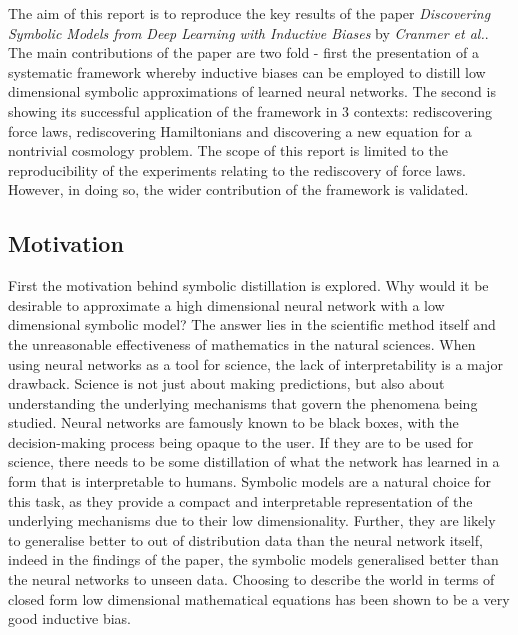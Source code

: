 \documentclass[11pt]{article}
\begin{document}





The aim of this report is to reproduce the key results of the paper \textit{Discovering Symbolic Models from Deep Learning with Inductive Biases} by \textit{Cranmer et al.}. The main contributions of the paper are two fold - first the presentation of a systematic framework whereby inductive biases can be employed to distill low dimensional symbolic approximations of learned neural networks. The second is showing its successful application of the framework in 3 contexts: rediscovering force laws, rediscovering Hamiltonians and discovering a new equation for a nontrivial cosmology problem.
The scope of this report is limited to the reproducibility of the experiments relating to the rediscovery of force laws. However, in doing so, the wider contribution of the framework is validated.
\subsection{Motivation}
First the motivation behind symbolic distillation is explored. Why would it be desirable to approximate a high dimensional neural network with a low dimensional symbolic model? The answer lies in the scientific method itself and the unreasonable effectiveness of mathematics in the natural sciences.
When using neural networks as a tool for science, the lack of interpretability is a major drawback. Science is not just about making predictions, but also about understanding the underlying mechanisms that govern the phenomena being studied. Neural networks are famously known to be black boxes, with the decision-making process being opaque to the user. If they are to be used for science, there needs to be some distillation of what the network has learned in a form that is interpretable to humans. 
Symbolic models are a natural choice for this task, as they provide a compact and interpretable representation of the underlying mechanisms due to their low dimensionality. Further, they are likely to generalise better to out of distribution data than the neural network itself, indeed in the findings of the paper, the symbolic models generalised better than the neural networks to unseen data. Choosing to describe the world in terms of closed form low dimensional mathematical equations has been shown to be a very good inductive bias. 
\end{document}
